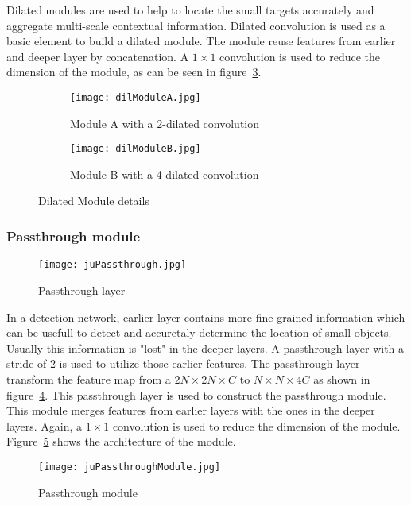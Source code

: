 Dilated modules are used to help to locate the small targets accurately and aggregate multi-scale contextual information. Dilated convolution is used as a basic element to build a dilated module. The module reuse features from earlier and deeper layer by concatenation. A $1 \times 1$ convolution is used to reduce the dimension of the module, as can be seen in figure~\ref{fig:dilModule}. 

\begin{figure}[h!]
	\begin{subfigure}{.5\textwidth}
		\centering
		    \texttt{[image: dilModuleA.jpg]}
		      \caption{Module A with a 2-dilated convolution}
			\label{fig:2DilConv}
	\end{subfigure}%
	\begin{subfigure}{.5\textwidth}
		\centering
		 \texttt{[image: dilModuleB.jpg]}
		 \caption{Module B with a 4-dilated convolution}
		 \label{fig:4DilConv}
	\end{subfigure}
	\caption{Dilated Module details}
	\label{fig:dilModule}
\end{figure}
\subsubsection{Passthrough module}

\begin{figure}[h!]
	\centering
	\texttt{[image: juPassthrough.jpg]}
	\caption[Workings of the passtrough layer]{Passthrough layer}
	\label{fig:passthroughLayer}
\end{figure}
In a detection network, earlier layer contains more fine grained information which can be usefull to detect and accuretaly determine the location of small objects. Usually this information is "lost" in the deeper layers. A passthrough layer with a stride of 2 is used to utilize those earlier features. The passthrough layer transform the feature map from a $2N \times 2N \times C$ to $N \times N \times 4C$ as shown in figure~\ref{fig:passthroughLayer}. This passthrough layer is used to construct the passthrough module. This module merges features from earlier layers with the ones in the deeper layers. Again, a $1 \times 1$ convolution is used to reduce the dimension of the module. Figure~\ref{fig:passthroughModule} shows the architecture of the module.

\begin{figure}[h!]
	\centering
	\texttt{[image: juPassthroughModule.jpg]}
	\caption[Passthrough module details from the Simple Detection Network for Small Object Detection]{Passthrough module}
	\label{fig:passthroughModule}
\end{figure}
